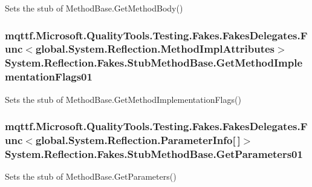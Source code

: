 Sets the stub of Method\-Base.\-Get\-Method\-Body()

\hypertarget{class_system_1_1_reflection_1_1_fakes_1_1_stub_method_base_aa4345f7b0b97ee51d66fde131804f545}{
\subsubsection[{Get\-Method\-Implementation\-Flags01}]{\setlength{\rightskip}{0pt plus 5cm}mqttf.\-Microsoft.\-Quality\-Tools.\-Testing.\-Fakes.\-Fakes\-Delegates.\-Func$<$global.\-System.\-Reflection.\-Method\-Impl\-Attributes$>$ System.\-Reflection.\-Fakes.\-Stub\-Method\-Base.\-Get\-Method\-Implementation\-Flags01}}\label{class_system_1_1_reflection_1_1_fakes_1_1_stub_method_base_aa4345f7b0b97ee51d66fde131804f545}


Sets the stub of Method\-Base.\-Get\-Method\-Implementation\-Flags()

\hypertarget{class_system_1_1_reflection_1_1_fakes_1_1_stub_method_base_a8073ee7e38955decfacbd4bf26f19637}{
\subsubsection[{Get\-Parameters01}]{\setlength{\rightskip}{0pt plus 5cm}mqttf.\-Microsoft.\-Quality\-Tools.\-Testing.\-Fakes.\-Fakes\-Delegates.\-Func$<$global.\-System.\-Reflection.\-Parameter\-Info\mbox{[}$\,$\mbox{]}$>$ System.\-Reflection.\-Fakes.\-Stub\-Method\-Base.\-Get\-Parameters01}}\label{class_system_1_1_reflection_1_1_fakes_1_1_stub_method_base_a8073ee7e38955decfacbd4bf26f19637}


Sets the stub of Method\-Base.\-Get\-Parameters()

